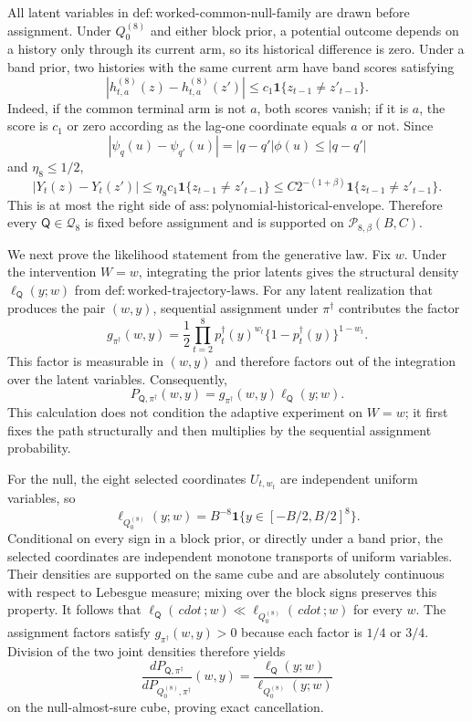 All latent variables in \(\mathrm{def{:}worked\mbox{-}common\mbox{-}null\mbox{-}family}\) are drawn before assignment.  Under \(Q_0^{(8)}\) and either block prior, a potential outcome depends on a history only through its current arm, so its historical difference is zero.  Under a band prior, two histories with the same current arm have band scores satisfying
\[
 \left|h_{t,a}^{(8)}(z)-h_{t,a}^{(8)}(z')\right|
 \le c_1\mathbf 1\{z_{t-1}\ne z'_{t-1}\}.
\]
Indeed, if the common terminal arm is not \(a\), both scores vanish; if it is \(a\), the score is \(c_1\) or zero according as the lag-one coordinate equals \(a\) or not.  Since
\[
 |\psi_q(u)-\psi_{q'}(u)|=|q-q'|\phi(u)\le |q-q'|
\]
and \(\eta_8\le1/2\),
\[
 |Y_t(z)-Y_t(z')|
 \le \eta_8c_1\mathbf 1\{z_{t-1}\ne z'_{t-1}\}
 \le C2^{-(1+\beta)}\mathbf 1\{z_{t-1}\ne z'_{t-1}\}.
\]
This is at most the right side of \(\mathrm{ass{:}polynomial\mbox{-}historical\mbox{-}envelope}\).  Therefore every \(\mathsf Q\in\mathcal Q_8\) is fixed before assignment and is supported on \(\mathcal P_{8,\beta}(B,C)\).

We next prove the likelihood statement from the generative law.  Fix \(w\).  Under the intervention \(W=w\), integrating the prior latents gives the structural density \(\ell_{\mathsf Q}(y;w)\) from \(\mathrm{def{:}worked\mbox{-}trajectory\mbox{-}laws}\).  For any latent realization that produces the pair \((w,y)\), sequential assignment under \(\pi^\dagger\) contributes the factor
\[
 g_{\pi^\dagger}(w,y)
 =\frac12\prod_{t=2}^8p_t^\dagger(y)^{w_t}
 \{1-p_t^\dagger(y)\}^{1-w_t}.
\]
This factor is measurable in \((w,y)\) and therefore factors out of the integration over the latent variables.  Consequently,
\[
 P_{\mathsf Q,\pi^\dagger}(w,y)
 =g_{\pi^\dagger}(w,y)\ell_{\mathsf Q}(y;w).
\]
This calculation does not condition the adaptive experiment on \(W=w\); it first fixes the path structurally and then multiplies by the sequential assignment probability.

For the null, the eight selected coordinates \(U_{t,w_t}\) are independent uniform variables, so
\[
 \ell_{Q_0^{(8)}}(y;w)=B^{-8}\mathbf 1\{y\in[-B/2,B/2]^8\}.
\]
Conditional on every sign in a block prior, or directly under a band prior, the selected coordinates are independent monotone transports of uniform variables.  Their densities are supported on the same cube and are absolutely continuous with respect to Lebesgue measure; mixing over the block signs preserves this property.  It follows that \(\ell_{\mathsf Q}(\,cdot\,;w)\ll\ell_{Q_0^{(8)}}(\,cdot\,;w)\) for every \(w\).  The assignment factors satisfy \(g_{\pi^\dagger}(w,y)>0\) because each factor is \(1/4\) or \(3/4\).  Division of the two joint densities therefore yields
\[
 \frac{dP_{\mathsf Q,\pi^\dagger}}
 {dP_{Q_0^{(8)},\pi^\dagger}}(w,y)
 =\frac{\ell_{\mathsf Q}(y;w)}
 {\ell_{Q_0^{(8)}}(y;w)}
\]
on the null-almost-sure cube, proving exact cancellation.

